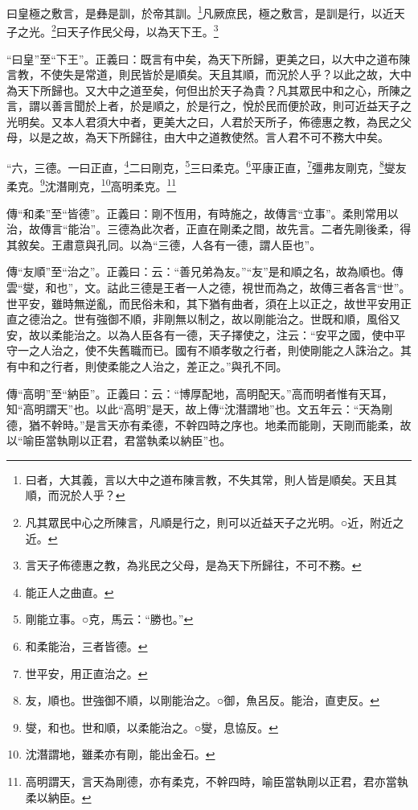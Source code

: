 曰皇極之敷言，是彝是訓，於帝其訓。\footnote{曰者，大其義，言以大中之道布陳言教，不失其常，則人皆是順矣。天且其順，而況於人乎？}凡厥庶民，極之敷言，是訓是行，以近天子之光。\footnote{凡其眾民中心之所陳言，凡順是行之，則可以近益天子之光明。○近，附近之近。}曰天子作民父母，以為天下王。\footnote{言天子佈德惠之教，為兆民之父母，是為天下所歸往，不可不務。}

{\noindent\shu{}\fzkt “曰皇”至“下王”。正義曰：既言有中矣，為天下所歸，更美之曰，以大中之道布陳言教，不使失是常道，則民皆於是順矣。天且其順，而況於人乎？以此之故，大中為天下所歸也。又大中之道至矣，何但出於天子為貴？凡其眾民中和之心，所陳之言，謂以善言聞於上者，於是順之，於是行之，悅於民而便於政，則可近益天子之光明矣。又本人君須大中者，更美大之曰，人君於天所子，佈德惠之教，為民之父母，以是之故，為天下所歸往，由大中之道教使然。言人君不可不務大中矣。 \par}

“六，三德。一曰正直，\footnote{能正人之曲直。}二曰剛克，\footnote{剛能立事。○克，馬云：“勝也。”}三曰柔克。\footnote{和柔能治，三者皆德。}平康正直，\footnote{世平安，用正直治之。}彊弗友剛克，\footnote{友，順也。世強御不順，以剛能治之。○御，魚呂反。能治，直吏反。}燮友柔克。\footnote{燮，和也。世和順，以柔能治之。○燮，息協反。}沈潛剛克，\footnote{沈潛謂地，雖柔亦有剛，能出金石。}高明柔克。\footnote{高明謂天，言天為剛德，亦有柔克，不幹四時，喻臣當執剛以正君，君亦當執柔以納臣。}


{\noindent\zhuan{}\fzbyks 傳“和柔”至“皆德”。正義曰：剛不恆用，有時施之，故傳言“立事”。柔則常用以治，故傳言“能治”。三德為此次者，正直在剛柔之間，故先言。二者先剛後柔，得其敘矣。王肅意與孔同。以為“三德，人各有一德，謂人臣也”。 \par}

{\noindent\zhuan{}\fzbyks 傳“友順”至“治之”。正義曰：云：“善兄弟為友。”“友”是和順之名，故為順也。傳雲“燮，和也”，文。詁此三德是王者一人之德，視世而為之，故傳三者各言“世”。世平安，雖時無逆亂，而民俗未和，其下猶有曲者，須在上以正之，故世平安用正直之德治之。世有強御不順，非剛無以制之，故以剛能治之。世既和順，風俗又安，故以柔能治之。以為人臣各有一德，天子擇使之，注云：“安平之國，使中平守一之人治之，使不失舊職而已。國有不順孝敬之行者，則使剛能之人誅治之。其有中和之行者，則使柔能之人治之，差正之。”與孔不同。 \par}

{\noindent\zhuan{}\fzbyks 傳“高明”至“納臣”。正義曰：云：“博厚配地，高明配天。”高而明者惟有天耳，知“高明謂天”也。以此“高明”是天，故上傳“沈潛謂地”也。文五年云：“天為剛德，猶不幹時。”是言天亦有柔德，不幹四時之序也。地柔而能剛，天剛而能柔，故以“喻臣當執剛以正君，君當執柔以納臣”也。 \par}

